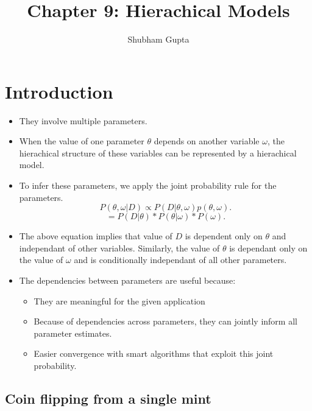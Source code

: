\documentclass{article}
\title{Chapter 9: Hierachical Models}
\author{Shubham Gupta}
\begin{document}
    
\maketitle

\section{Introduction}

\begin{itemize}
    \item They involve multiple parameters.
    \item When the value of one parameter $\theta$ depends on another variable  $\omega$, the hierachical structure of these variables can be represented by a hierachical model.
    \item To infer these parameters, we apply the joint probability rule for the parameters. \[
            P(\theta, \omega|D) \propto P(D|\theta, \omega) p(\theta, \omega) 
        .\] 
        \[
            = P(D|\theta) * P(\theta|\omega) * P(\omega)
        .\] 
    \item The above equation implies that value of $D$ is dependent only on  $\theta$ and independant of other variables. Similarly, the value of  $\theta$ is dependant only on the value of  $\omega$ and is conditionally independant of all other parameters.
    \item The dependencies between parameters are useful because:
        \begin{itemize}
            \item They are meaningful for the given application
            \item Because of dependencies across parameters, they can jointly inform all parameter estimates.
            \item Easier convergence with smart algorithms that exploit this joint probability.
        \end{itemize}
\end{itemize}

\subsection{Coin flipping from a single mint}
\end{document}
